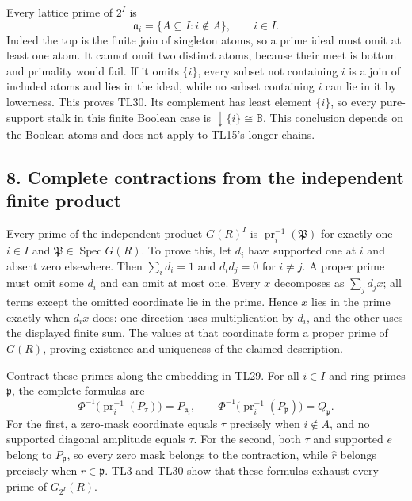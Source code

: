 \documentclass[11pt,a4paper]{article}
\theoremstyle{definition}\newtheorem{definition}[theorem]{Definition}
\begin{document}
Every lattice prime of \(2^I\) is \[
 \mathfrak a_i=\{A\subseteq I:i\notin A\},\qquad i\in I.
 \tag{TL30}
\] Indeed the top is the finite join of singleton atoms, so a prime
ideal must omit at least one atom. It cannot omit two distinct atoms,
because their meet is bottom and primality would fail. If it omits
\(\{i\}\), every subset not containing \(i\) is a join of included atoms
and lies in the ideal, while no subset containing \(i\) can lie in it by
lowerness. This proves TL30. Its complement has least element \(\{i\}\),
so every pure-support stalk in this finite Boolean case is
\(\downarrow\{i\}\cong\mathbb B\). This conclusion depends on the
Boolean atoms and does not apply to TL15's longer chains.

\subsection{8. Complete contractions from the independent finite
product}\label{complete-contractions-from-the-independent-finite-product}

Every prime of the independent product \(G(R)^I\) is
\(\operatorname{pr}_i^{-1}(\mathfrak P)\) for exactly one \(i\in I\) and
\(\mathfrak P\in\operatorname{Spec}G(R)\). To prove this, let \(d_i\)
have supported one at \(i\) and absent zero elsewhere. Then
\(\sum_i d_i=1\) and \(d_id_j=0\) for \(i\ne j\). A proper prime must
omit some \(d_i\) and can omit at most one. Every \(x\) decomposes as
\(\sum_jd_jx\); all terms except the omitted coordinate lie in the
prime. Hence \(x\) lies in the prime exactly when \(d_ix\) does: one
direction uses multiplication by \(d_i\), and the other uses the
displayed finite sum. The values at that coordinate form a proper prime
of \(G(R)\), proving existence and uniqueness of the claimed
description.

Contract these primes along the embedding in TL29. For all \(i\in I\)
and ring primes \(\mathfrak p\), the complete formulas are \[
 \boxed{\Phi^{-1}\bigl(\operatorname{pr}_i^{-1}(P_\tau)\bigr)=P_{\mathfrak a_i},\qquad
 \Phi^{-1}\bigl(\operatorname{pr}_i^{-1}(P_{\mathfrak p})\bigr)=Q_{\mathfrak p}.}
 \tag{TL31}
\] For the first, a zero-mask coordinate equals \(\tau\) precisely when
\(i\notin A\), and no supported diagonal amplitude equals \(\tau\). For
the second, both \(\tau\) and supported \(e\) belong to
\(P_{\mathfrak p}\), so every zero mask belongs to the contraction,
while \(\widehat r\) belongs precisely when \(r\in\mathfrak p\). TL3 and
TL30 show that these formulas exhaust every prime of \(G_{2^I}(R)\).
\end{document}
